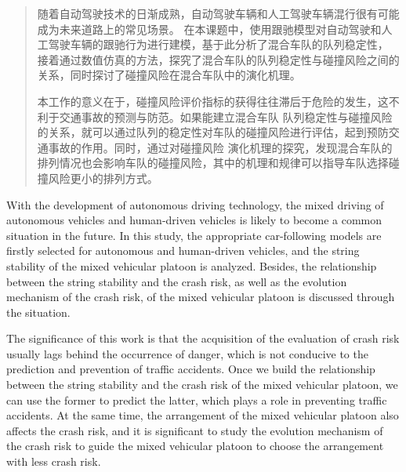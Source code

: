 

\begin{abstract}
随着自动驾驶技术的日渐成熟，自动驾驶车辆和人工驾驶车辆混行很有可能成为未来道路上的常见场景。
在本课题中，使用跟驰模型对自动驾驶和人工驾驶车辆的跟驰行为进行建模，基于此分析了混合车队的队列稳定性，
接着通过数值仿真的方法，探究了混合车队的队列稳定性与碰撞风险之间的关系，同时探讨了碰撞风险在混合车队中的演化机理。

本工作的意义在于，碰撞风险评价指标的获得往往滞后于危险的发生，这不利于交通事故的预测与防范。如果能建立混合车队
队列稳定性与碰撞风险的关系，就可以通过队列的稳定性对车队的碰撞风险进行评估，起到预防交通事故的作用。同时，通过对碰撞风险
演化机理的探究，发现混合车队的排列情况也会影响车队的碰撞风险，其中的机理和规律可以指导车队选择碰撞风险更小的排列方式。


\end{abstract}

\begin{abstract*}
  
With the development of autonomous driving technology, 
the mixed driving of autonomous vehicles and human-driven vehicles is likely to become a common situation in the future.
In this study, the appropriate car-following models are firstly selected for autonomous and human-driven vehicles,
and the string stability of the mixed vehicular platoon is analyzed.
Besides, the relationship between the string stability and the crash risk, 
as well as the evolution mechanism of the crash risk,  of the mixed vehicular platoon is discussed 
through the situation. 

The significance of this work is that the acquisition of the evaluation of crash risk usually lags behind the
occurrence of danger, which is not conducive to the prediction and prevention of traffic accidents.
Once we build the relationship between the string stability and the crash risk of the mixed vehicular platoon,
we can use the former to predict the latter,
which plays a role in preventing traffic accidents. 
At the same time, the arrangement of the mixed vehicular platoon also affects the crash risk,
and it is significant to study the evolution mechanism of the crash risk 
to guide the mixed vehicular platoon to choose the arrangement with less crash risk.

\end{abstract*}